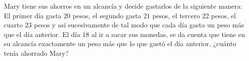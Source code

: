 Mary tiene sus ahorros en un alcancía y decide gastarlos de la siguiente manera: El primer día gasta $20$ pesos, el segundo gasta $21$ pesos, el tercero $22$ pesos, el cuarto $23$ pesos y así sucesivamente de tal modo que cada día gasta un peso más que el día anterior. El día $18$ al ir a sacar sus monedas, se da cuenta que tiene en su alcancía exactamente un peso más que lo que gastó el día anterior, ¿cuánto tenía ahorrado Mary?